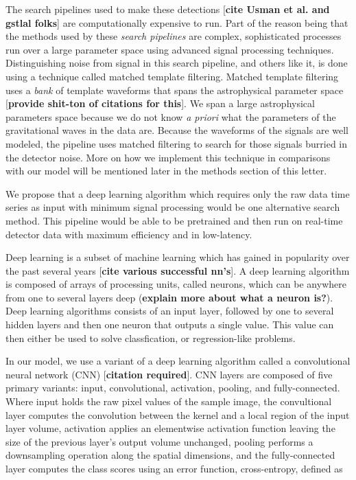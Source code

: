 \documentclass[%
 amsmath,amssymb,
 aps,
 twocolumn,
floatfix,
]{revtex4-1}
\begin{document}
The search pipelines used to make these detections [\textbf{cite Usman et al. and gstlal folks}] are computationally expensive to run. Part of the reason being that the methods used by these \textit{search pipelines} are complex, sophisticated processes run over a large parameter space using advanced signal processing techniques. Distinguishing noise from signal in this search pipeline, and others like it, is done using a technique called matched template filtering. Matched template filtering uses a \textit{bank} of template waveforms that spans the astrophysical parameter space [\textbf{provide shit-ton of citations for this}]. We span a large astrophysical parameters space because we do not know \textit{a priori} what the parameters of the gravitational waves in the data are. Because the waveforms of the signals are well modeled, the pipeline uses matched filtering to search for those signals burried in the detector noise. More on how we implement this technique in comparisons with our model will be mentioned later in the methods section of this letter.

We propose that a deep learning algorithm which requires only the raw data time series as input with minimum signal processing would be one alternative search method. This pipeline would be able to be pretrained and then run on real-time detector data with maximum efficiency and in low-latency.

Deep learning is a subset of machine learning which has gained in popularity over the past several years [\textbf{cite various successful nn's}]. A deep learning algorithm is composed of arrays of processing units, called neurons, which can be anywhere from one to several layers deep (\textbf{explain more about what a neuron is?}). Deep learning algorithms consists of an input layer, followed by one to several hidden layers and then one neuron that outputs a single value. This value can then either be used to solve classfication, or regression-like problems. 

In our model, we use a variant of a deep learning algorithm called a convolutional neural network (CNN) [\textbf{citation required}]. CNN layers are composed of five primary variants: input, convolutional, activation, pooling, and fully-connected. Where input holds the raw pixel values of the sample image, the convultional layer computes the convolution between the kernel and a local region of the input layer volume, activation applies an elementwise activation function leaving the size of the previous layer's output volume unchanged, pooling performs a downsampling operation along the spatial dimensions, and the fully-connected layer computes the class scores using an error function, cross-entropy, defined as
\end{document}
